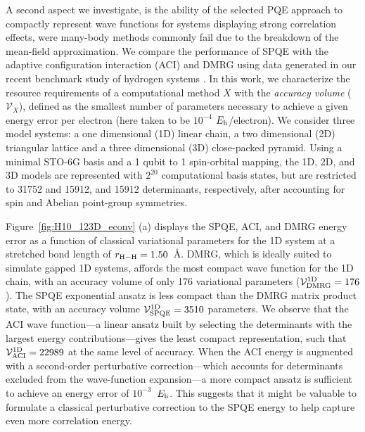\documentclass[aps,prx, reprint]{revtex4-2}
\newcommand*{\Eh}{$E_{\rm h}$\xspace}
\begin{document}
A second aspect we investigate, is the ability of the selected PQE approach to compactly represent wave functions for systems displaying strong correlation effects, were many-body methods commonly fail due to the breakdown of the mean-field approximation.
We compare the performance of SPQE with the adaptive configuration interaction \cite{Schriber2016Adaptive} (ACI) and DMRG using data generated in our recent benchmark study of hydrogen systems \cite{stair2020exploring}.
In this work, we characterize the resource requirements of a computational method $X$ with the \textit{accuracy volume} ($\mathcal{V}_X$), defined as the smallest number of parameters necessary to achieve a given energy error per electron (here taken to be $10^{-4}$ \Eh/electron).
We consider three  model systems: a one dimensional (1D) linear chain, a two dimensional (2D) triangular lattice and a three dimensional (3D) close-packed pyramid.
Using a minimal STO-6G basis and a 1 qubit to 1 spin-orbital mapping, the 1D, 2D, and 3D  models are represented with $2^{20}$ computational basis states, but are restricted to 31752 and 15912, and 15912 determinants, respectively, after accounting for spin and Abelian point-group symmetries.

Figure~\ref{fig:H10_123D_econv} (a) displays the SPQE, ACI, and DMRG energy error as a function of classical variational parameters for the 1D  system at a stretched bond length of $r_{\rm{H-H}}=1.50$~{\AA}.
DMRG, which is ideally suited to simulate gapped 1D systems, affords the most compact wave function for the 1D chain, with an accuracy volume of only 176 variational parameters ($\mathcal{V}_{\rm{DMRG}}^{\rm{1D}} = 176$).
The SPQE exponential ansatz is less compact than the DMRG matrix product state, with an accuracy volume $\mathcal{V}_{\rm{SPQE}}^{\rm{1D}} = 3510$ parameters.
We observe that the ACI wave function---a linear ansatz built by selecting the determinants with the largest energy contributions---gives the least compact representation, such that $\mathcal{V}_{\rm{ACI}}^{\rm{1D}} = 22989$ at the same level of accuracy.
When the ACI energy is augmented with a second-order perturbative correction---which accounts for determinants excluded from the  wave-function expansion---a more compact ansatz is sufficient to achieve an energy error of $10^{-3}$~\Eh.
This suggests that it might be valuable to formulate a classical perturbative correction to the SPQE energy to help capture even more correlation energy.
\end{document}
